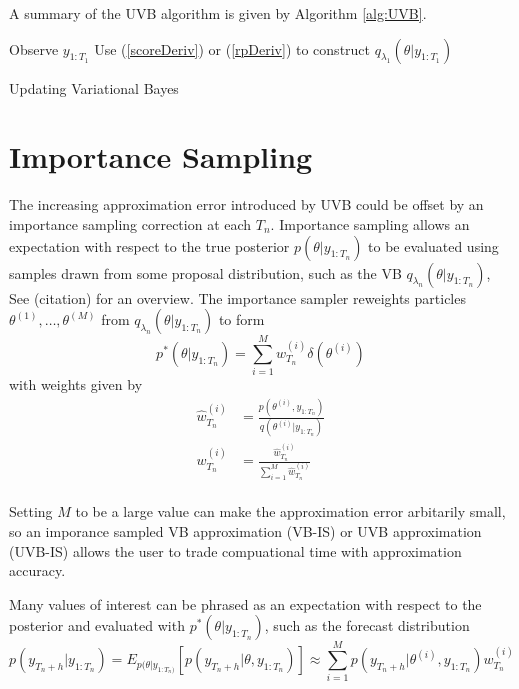 \documentclass[12pt,a4paper]{article}\usepackage[]{graphicx}\usepackage[]{color}
\begin{document}
A summary of the UVB algorithm is given by Algorithm \ref{alg:UVB}.

\begin{algorithm}[H]
 Observe $y_{1:T_1}$\;
 Use (\ref{scoreDeriv}) or (\ref{rpDeriv}) to construct $q_{\lambda_1}(\theta | y_{1:T_1})$\;
 \caption{Updating Variational Bayes}
  \label{alg:UVB}
\end{algorithm}

\section{Importance Sampling} \label{sec:IS}

The increasing approximation error introduced by UVB could be offset by an importance sampling correction at each $T_n$. Importance sampling allows an expectation with respect to the true posterior $p(\theta | y_{1:T_n})$ to be evaluated using samples drawn from some proposal distribution, such as the VB $q_{\lambda_n}(\theta | y_{1:T_n})$, See (citation) for an overview. The importance sampler reweights particles $\theta^{(1)}, \dots, \theta^{(M)}$ from $q_{\lambda_n}(\theta | y_{1:T_n})$ to form 
\begin{equation}
\label{IS:Approx}
p^*(\theta | y_{1:T_n}) = \sum_{i=1}^M w^{(i)}_{T_n} \delta(\theta^{(i)})
\end{equation}
with weights given by
\begin{align}
\hat{w}^{(i)}_{T_n} &= \frac{p(\theta^{(i)}, y_{1:T_n})}{q(\theta^{(i)} | y_{1:T_n})} \label{IS:Weights} \\
w^{(i)}_{T_n} &= \frac{\hat{w}^{(i)}_{T_n}}{\sum_{i=1}^M \hat{w}^{(i)}_{T_n}} \label{IS:WeightsNorm}
\end{align}
\\
Setting $M$ to be a large value can make the approximation error arbitarily small, so an imporance sampled VB approximation (VB-IS) or UVB approximation (UVB-IS) allows the user to trade compuational time with approximation accuracy.

Many values of interest can be phrased as an expectation with respect to the posterior and evaluated with $p^*(\theta | y_{1:T_n})$, such as the forecast distribution
\begin{equation}
p(y_{T_n+h} | y_{1:T_n}) =  E_{p(\theta | y_{1:T_n)}}\left[p(y_{T_n+h} | \theta, y_{1:T_n})\right] \approx \sum_{i=1}^M p(y_{T_n+h} | \theta^{(i)}, y_{1:T_n}) w^{(i)}_{T_n}
\end{equation}
\end{document}
